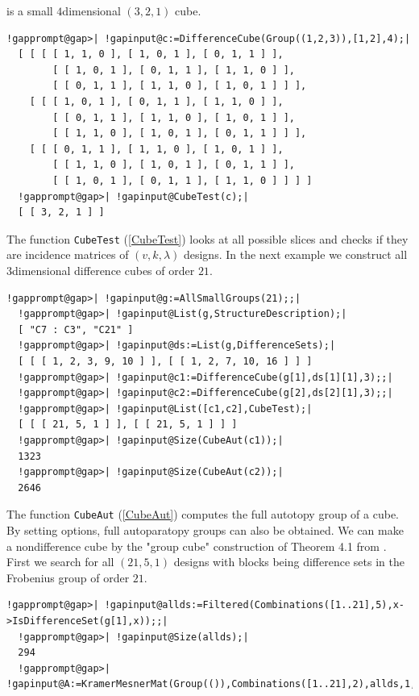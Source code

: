 \documentclass[a4paper,11pt]{report}
\begin{document}
{{is a small $4$\texttt{}dimensional $(3,2,1)$ cube. 
\begin{Verbatim}[commandchars=!@|,fontsize=\small,frame=single,label=Example]
  !gapprompt@gap>| !gapinput@c:=DifferenceCube(Group((1,2,3)),[1,2],4);|
  [ [ [ [ 1, 1, 0 ], [ 1, 0, 1 ], [ 0, 1, 1 ] ], 
        [ [ 1, 0, 1 ], [ 0, 1, 1 ], [ 1, 1, 0 ] ], 
        [ [ 0, 1, 1 ], [ 1, 1, 0 ], [ 1, 0, 1 ] ] ], 
    [ [ [ 1, 0, 1 ], [ 0, 1, 1 ], [ 1, 1, 0 ] ], 
        [ [ 0, 1, 1 ], [ 1, 1, 0 ], [ 1, 0, 1 ] ], 
        [ [ 1, 1, 0 ], [ 1, 0, 1 ], [ 0, 1, 1 ] ] ], 
    [ [ [ 0, 1, 1 ], [ 1, 1, 0 ], [ 1, 0, 1 ] ], 
        [ [ 1, 1, 0 ], [ 1, 0, 1 ], [ 0, 1, 1 ] ], 
        [ [ 1, 0, 1 ], [ 0, 1, 1 ], [ 1, 1, 0 ] ] ] ]
  !gapprompt@gap>| !gapinput@CubeTest(c);|
  [ [ 3, 2, 1 ] ]
\end{Verbatim}
 The function \texttt{CubeTest} (\ref{CubeTest}) looks at all possible slices and checks if they are incidence matrices of $(v,k,\lambda)$ designs. In the next example we construct all $3$\texttt{}dimensional difference cubes of order $21$. 
\begin{Verbatim}[commandchars=!@|,fontsize=\small,frame=single,label=Example]
  !gapprompt@gap>| !gapinput@g:=AllSmallGroups(21);;|
  !gapprompt@gap>| !gapinput@List(g,StructureDescription);|
  [ "C7 : C3", "C21" ]
  !gapprompt@gap>| !gapinput@ds:=List(g,DifferenceSets);|
  [ [ [ 1, 2, 3, 9, 10 ] ], [ [ 1, 2, 7, 10, 16 ] ] ]
  !gapprompt@gap>| !gapinput@c1:=DifferenceCube(g[1],ds[1][1],3);;|
  !gapprompt@gap>| !gapinput@c2:=DifferenceCube(g[2],ds[2][1],3);;|
  !gapprompt@gap>| !gapinput@List([c1,c2],CubeTest);|
  [ [ [ 21, 5, 1 ] ], [ [ 21, 5, 1 ] ] ]
  !gapprompt@gap>| !gapinput@Size(CubeAut(c1));|
  1323
  !gapprompt@gap>| !gapinput@Size(CubeAut(c2));|
  2646
\end{Verbatim}
 The function \texttt{CubeAut} (\ref{CubeAut}) computes the full autotopy group of a cube. By setting options, full
autoparatopy groups can also be obtained. We can make a
non\texttt{}difference cube by the "group cube" construction of
Theorem 4.1 from \cite{KPT23}. First we search for all $(21,5,1)$ designs with blocks being difference sets in the Frobenius group of order $21$. 
\begin{Verbatim}[commandchars=!@|,fontsize=\small,frame=single,label=Example]
  !gapprompt@gap>| !gapinput@allds:=Filtered(Combinations([1..21],5),x->IsDifferenceSet(g[1],x));;|
  !gapprompt@gap>| !gapinput@Size(allds);|
  294
  !gapprompt@gap>| !gapinput@A:=KramerMesnerMat(Group(()),Combinations([1..21],2),allds,1,21);;|

\end{Verbatim}}}
\end{document}
